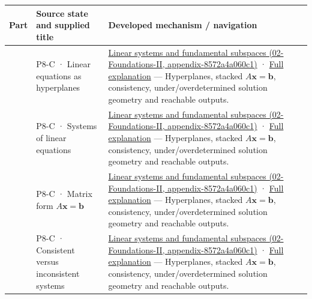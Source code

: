 {\def\LTcaptype{none} %
\begin{longtable}[]{@{}
  >{\raggedright\arraybackslash}p{}
  >{\raggedright\arraybackslash}p{}
  >{\raggedright\arraybackslash}p{}@{}}
\toprule\noalign{}
\begin{minipage}[b]{\linewidth}\raggedright
Part
\end{minipage} & \begin{minipage}[b]{\linewidth}\raggedright
Source state and supplied title
\end{minipage} & \begin{minipage}[b]{\linewidth}\raggedright
Developed mechanism / navigation
\end{minipage} \\
\midrule\noalign{}
\endhead
\bottomrule\noalign{}
\endlastfoot
701 & P8-C · Linear equations as hyperplanes & \href{../02-Foundations-II/main.pdf\#nameddest=appendix-8572a4a060c1}{Linear systems and fundamental subspaces (02-Foundations-II, appendix-8572a4a060c1)} · \hyperref[01-foundations-i-ch019-a-system-is-an-intersection-of-constraints]{Full explanation} --- Hyperplanes, stacked \(A\mathbf x=\mathbf b\), consistency, under/overdetermined solution geometry and reachable outputs. \\
702 & P8-C · Systems of linear equations & \href{../02-Foundations-II/main.pdf\#nameddest=appendix-8572a4a060c1}{Linear systems and fundamental subspaces (02-Foundations-II, appendix-8572a4a060c1)} · \hyperref[01-foundations-i-ch019-a-system-is-an-intersection-of-constraints]{Full explanation} --- Hyperplanes, stacked \(A\mathbf x=\mathbf b\), consistency, under/overdetermined solution geometry and reachable outputs. \\
703 & P8-C · Matrix form \(A\mathbf x=\mathbf b\) & \href{../02-Foundations-II/main.pdf\#nameddest=appendix-8572a4a060c1}{Linear systems and fundamental subspaces (02-Foundations-II, appendix-8572a4a060c1)} · \hyperref[01-foundations-i-ch019-a-system-is-an-intersection-of-constraints]{Full explanation} --- Hyperplanes, stacked \(A\mathbf x=\mathbf b\), consistency, under/overdetermined solution geometry and reachable outputs. \\
704 & P8-C · Consistent versus inconsistent systems & \href{../02-Foundations-II/main.pdf\#nameddest=appendix-8572a4a060c1}{Linear systems and fundamental subspaces (02-Foundations-II, appendix-8572a4a060c1)} · \hyperref[01-foundations-i-ch019-a-system-is-an-intersection-of-constraints]{Full explanation} --- Hyperplanes, stacked \(A\mathbf x=\mathbf b\), consistency, under/overdetermined solution geometry and reachable outputs. \\

\end{longtable}}
